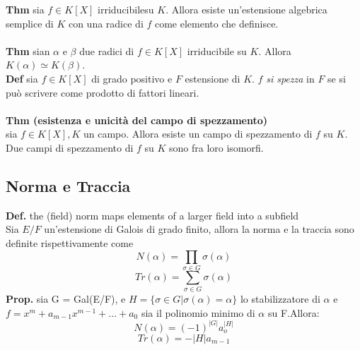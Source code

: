\documentclass[10pt,a4paper]{article}
\begin{document}
\textbf{Thm} sia $f\in K[X]$ irriducibilesu $K$. Allora esiste un'estensione algebrica semplice di $K$ con una radice di $f$ come elemento che definisce.\\\\
\textbf{Thm} sian $\alpha$ e $\beta$ due radici di $f \in K[X]$ irriducibile su $K$. Allora $K(\alpha) \simeq K(\beta)$.\\
\textbf{Def} sia $f \in K[X]$ di grado positivo e $F$ estensione di $K$. $f$ \emph{si spezza} in $F$ se si può scrivere come prodotto di fattori lineari.\\\\
\textbf{Thm (esistenza e unicità del campo di spezzamento)}\\
sia $f \in K[X],K$ un campo. Allora esiste un campo di spezzamento di $f$ su $K$. Due campi di spezzamento di $f$ su $K$ sono fra loro isomorfi.
\subsection{Norma e Traccia}
\textbf{Def.} the (field) norm maps elements of a larger field into a subfield\\
Sia $E/F$ un'estensione di Galois di grado finito, allora la norma e la traccia sono definite rispettivamente come
$$N(\alpha) = \prod_{\sigma \in G} \sigma(\alpha)$$
$$ Tr(\alpha) = \sum_{\sigma \in G} \sigma(\alpha)$$
\textbf{Prop.} sia G = Gal(E/F), e $H = \{\sigma \in G | \sigma(\alpha) = \alpha\}$ lo stabilizzatore di $\alpha$ e\\ $f = x^m+a_{m-1}x^{m-1}+...+a_0$ sia il polinomio minimo di $\alpha$ su F.Allora:\\
$$N(\alpha) = (-1)^{|G|}a_o^{|H|}$$
$$Tr(\alpha) = - |H|a_{m-1}$$
\end{document}

